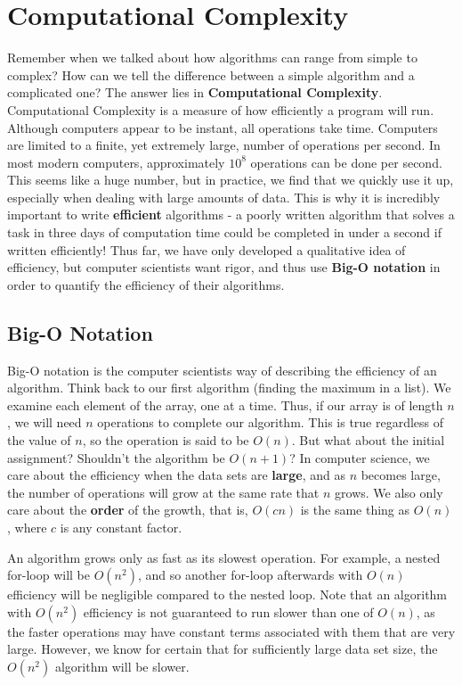 \section{Computational Complexity}

Remember when we talked about how algorithms can range from simple to complex? How can we tell the difference between a simple algorithm and a complicated one? The answer lies in \textbf{Computational Complexity}.  Computational Complexity is a measure of how efficiently a program will run.  Although computers appear to be instant, all operations take time.  Computers are limited to a finite, yet extremely large, number of operations per second. In most modern computers, approximately $ 10^8 $ operations can be done per second.  This seems like a huge number, but in practice, we find that we quickly use it up, especially when dealing with large amounts of data.  This is why it is incredibly important to write \textbf{efficient} algorithms - a poorly written algorithm that solves a task in three days of computation time could be completed in under a second if written efficiently! Thus far, we have only developed a qualitative idea of efficiency, but computer scientists want rigor, and thus use \textbf{Big-O notation} in order to quantify the efficiency of their algorithms.

\subsection{Big-O Notation}

Big-O notation is the computer scientists way of describing the efficiency of an algorithm.  Think back to our first algorithm (finding the maximum in a list).  We examine each element of the array, one at a time.  Thus, if our array is of length $ n $, we will need $ n $ operations to complete our algorithm.  This is true regardless of the value of $ n $, so the operation is said to be $ O(n) $.  But what about the initial assignment? Shouldn't the algorithm be $ O(n + 1) $?  In computer science, we care about the efficiency when the data sets are \textbf{large}, and as $ n $ becomes large, the number of operations will grow at the same rate that $ n $ grows.  We also only care about the \textbf{order} of the growth, that is, $ O(cn) $ is the same thing as $ O(n) $, where $ c $ is any constant factor.

An algorithm grows only as fast as its slowest operation.  For example, a nested for-loop will be $ O(n^2) $, and so another for-loop afterwards with $ O(n) $ efficiency will be negligible compared to the nested loop.  Note that an algorithm with $ O(n^2) $ efficiency is not guaranteed to run slower than one of $ O(n) $, as the faster operations may have constant terms associated with them that are very large.  However, we know for certain that for sufficiently large data set size, the $ O(n^2) $ algorithm will be slower.


